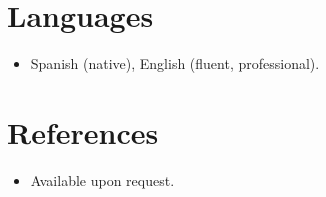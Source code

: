 \documentclass[11pt,a4paper,sans]{moderncv}
\begin{document}

\section{Languages}
\vspace{1pt}
\begin{itemize}
\item Spanish (native), English (fluent, professional).
\end{itemize}


\section{References}
\vspace{1pt}
\begin{itemize}
\item{Available upon request.}
\end{itemize}
\end{document}
